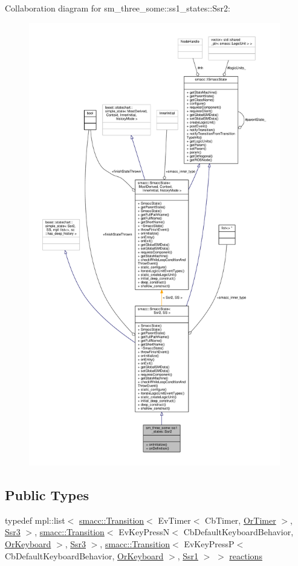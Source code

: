 Collaboration diagram for sm\+\_\+three\+\_\+some\+:\+:ss1\+\_\+states\+:\+:Ssr2\+:\nopagebreak
\begin{figure}[H]
\begin{center}
\leavevmode
\includegraphics[height=550pt]{structsm__three__some_1_1ss1__states_1_1Ssr2__coll__graph}
\end{center}
\end{figure}
\subsection*{Public Types}
\begin{DoxyCompactItemize}
\item 
typedef mpl\+::list$<$ \hyperlink{classsmacc_1_1Transition}{smacc\+::\+Transition}$<$ Ev\+Timer$<$ Cb\+Timer, \hyperlink{classsm__three__some_1_1OrTimer}{Or\+Timer} $>$, \hyperlink{structsm__three__some_1_1ss1__states_1_1Ssr3}{Ssr3} $>$, \hyperlink{classsmacc_1_1Transition}{smacc\+::\+Transition}$<$ Ev\+Key\+PressN$<$ Cb\+Default\+Keyboard\+Behavior, \hyperlink{classsm__three__some_1_1OrKeyboard}{Or\+Keyboard} $>$, \hyperlink{structsm__three__some_1_1ss1__states_1_1Ssr3}{Ssr3} $>$, \hyperlink{classsmacc_1_1Transition}{smacc\+::\+Transition}$<$ Ev\+Key\+PressP$<$ Cb\+Default\+Keyboard\+Behavior, \hyperlink{classsm__three__some_1_1OrKeyboard}{Or\+Keyboard} $>$, \hyperlink{structsm__three__some_1_1ss1__states_1_1Ssr1}{Ssr1} $>$ $>$ \hyperlink{structsm__three__some_1_1ss1__states_1_1Ssr2_ace967d354888d5ed4b12f987c6357843}{reactions}
\end{DoxyCompactItemize}

